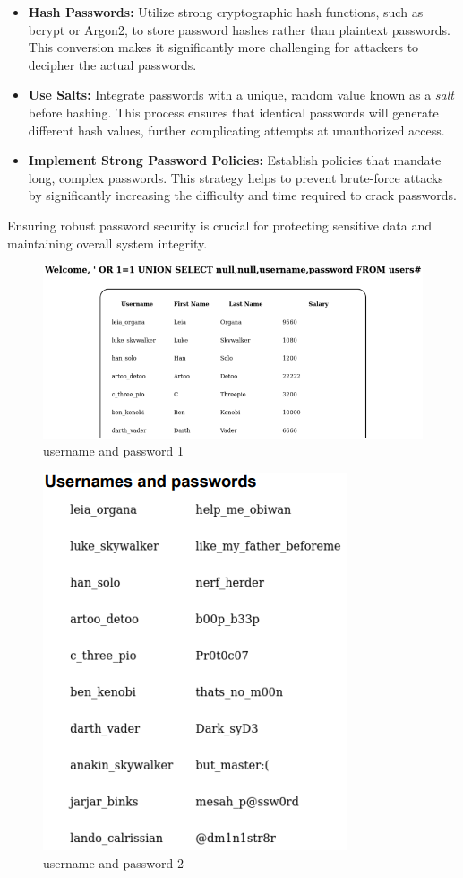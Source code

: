 \begin{itemize}
      \item \textbf{Hash Passwords:} Utilize strong cryptographic hash functions, such as bcrypt or Argon2, to store password hashes rather than plaintext passwords. This conversion makes it significantly more challenging for attackers to decipher the actual passwords.
      \item \textbf{Use Salts:} Integrate passwords with a unique, random value known as a \textit{salt} before hashing. This process ensures that identical passwords will generate different hash values, further complicating attempts at unauthorized access.
      \item \textbf{Implement Strong Password Policies:} Establish policies that mandate long, complex passwords. This strategy helps to prevent brute-force attacks by significantly increasing the difficulty and time required to crack passwords.
\end{itemize}

Ensuring robust password security is crucial for protecting sensitive data and maintaining overall system integrity.

\begin{figure}[H]
      \centering
      \includegraphics[width=\linewidth]{pic/username and password 1.png}
      \caption{username and password 1}
      \label{fig:username and password 1}
\end{figure}

\begin{figure}[H]
      \centering
      \includegraphics[width=0.4\linewidth]{pic/username and password 2.png}
      \caption{username and password 2}
      \label{fig:username and password 2}
\end{figure}


